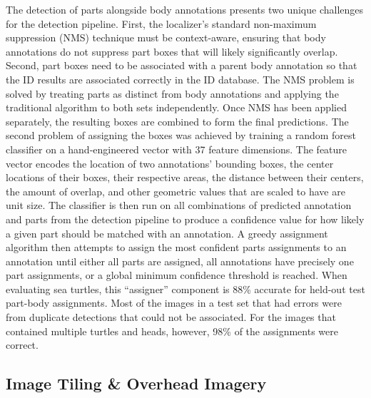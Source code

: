 The detection of parts alongside body annotations presents two unique challenges for the detection pipeline.  First, the localizer's standard non-maximum suppression (NMS) technique must be context-aware, ensuring that body annotations do not suppress part boxes that will likely significantly overlap.  Second, part boxes need to be associated with a parent body annotation so that the ID results are associated correctly in the ID database.  The NMS problem is solved by treating parts as distinct from body annotations and applying the traditional algorithm to both sets independently.  Once NMS has been applied separately, the resulting boxes are combined to form the final predictions.  The second problem of assigning the boxes was achieved by training a random forest classifier on a hand-engineered vector with 37 feature dimensions.  The feature vector encodes the location of two annotations' bounding boxes, the center locations of their boxes, their respective areas, the distance between their centers, the amount of overlap, and other geometric values that are scaled to have are unit size.  The classifier is then run on all combinations of predicted annotation and parts from the detection pipeline to produce a confidence value for how likely a given part should be matched with an annotation.  A greedy assignment algorithm then attempts to assign the most confident parts assignments to an annotation until either all parts are assigned, all annotations have precisely one part assignments, or a global minimum confidence threshold is reached.  When evaluating sea turtles, this ``assigner'' component is 88\% accurate for held-out test part-body assignments.  Most of the images in a test set that had errors were from duplicate detections that could not be associated.  For the images that contained multiple turtles and heads, however, 98\% of the assignments were correct.

\subsection{Image Tiling \& Overhead Imagery}

